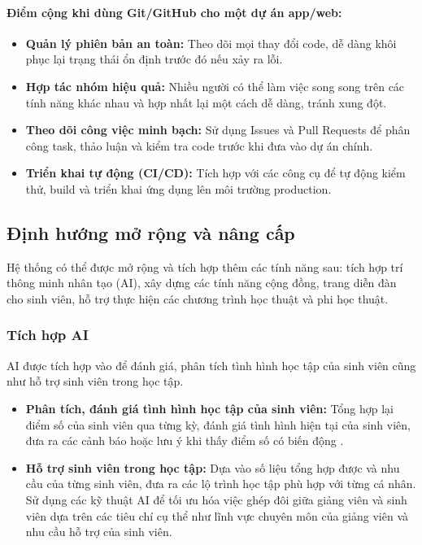 \paragraph{Điểm cộng khi dùng Git/GitHub cho một dự án app/web:}
\begin{itemize}
    \item \textbf{Quản lý phiên bản an toàn:}  
    Theo dõi mọi thay đổi code, dễ dàng khôi phục lại trạng thái ổn định trước đó nếu xảy ra lỗi.

    \item \textbf{Hợp tác nhóm hiệu quả:}  
    Nhiều người có thể làm việc song song trên các tính năng khác nhau và hợp nhất lại một cách dễ dàng, tránh xung đột.

    \item \textbf{Theo dõi công việc minh bạch:}  
    Sử dụng Issues và Pull Requests để phân công task, thảo luận và kiểm tra code trước khi đưa vào dự án chính.

    \item \textbf{Triển khai tự động (CI/CD):}  
    Tích hợp với các công cụ để tự động kiểm thử, build và triển khai ứng dụng lên môi trường production.
\end{itemize}

\subsection{Định hướng mở rộng và nâng cấp} 
Hệ thống có thể được mở rộng và tích hợp thêm các tính năng sau: tích hợp trí thông minh nhân tạo (AI), xây dựng các tính năng cộng đồng, trang diễn đàn cho sinh viên, hỗ trợ thực hiện các chương trình học thuật và phi học thuật.

\subsubsection{Tích hợp AI}
AI được tích hợp vào để đánh giá, phân tích tình hình học tập của sinh viên cũng như hỗ trợ sinh viên trong học tập.
\begin{itemize}
    \item \textbf{Phân tích, đánh giá tình hình học tập của sinh viên:}
    Tổng hợp lại điểm số của sinh viên qua từng kỳ, đánh giá tình hình hiện tại của sinh viên, đưa ra các cảnh báo hoặc lưu ý khi thấy điểm số có biến động .
    
    \item  \textbf{Hỗ trợ sinh viên trong học tập:}
    Dựa vào số liệu tổng hợp được và nhu cầu của từng sinh viên, đưa ra các lộ trình học tập phù hợp với từng cá nhân. Sử dụng các kỹ thuật AI để tối ưu hóa việc ghép đôi giữa giảng viên và sinh viên dựa trên các tiêu chí cụ thể như lĩnh vực chuyên môn của giảng viên và nhu cầu hỗ trợ của sinh viên.
\end{itemize}

